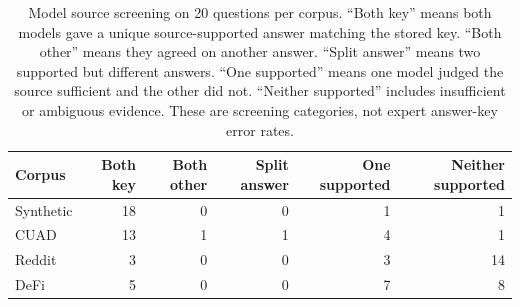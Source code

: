 \begin{table}[h]\centering\small
\caption{Model source screening on 20 questions per corpus. ``Both key'' means both models gave a unique source-supported answer matching the stored key. ``Both other'' means they agreed on another answer. ``Split answer'' means two supported but different answers. ``One supported'' means one model judged the source sufficient and the other did not. ``Neither supported'' includes insufficient or ambiguous evidence. These are screening categories, not expert answer-key error rates.}
\label{tab:source-screen}
\begin{tabular}{@{}lrrrrr@{}}\toprule
Corpus & Both key & Both other & Split answer & One supported & Neither supported\\\midrule
Synthetic & 18 & 0 & 0 & 1 & 1\\
CUAD & 13 & 1 & 1 & 4 & 1\\
Reddit & 3 & 0 & 0 & 3 & 14\\
DeFi & 5 & 0 & 0 & 7 & 8\\\bottomrule
\end{tabular}
\end{table}

